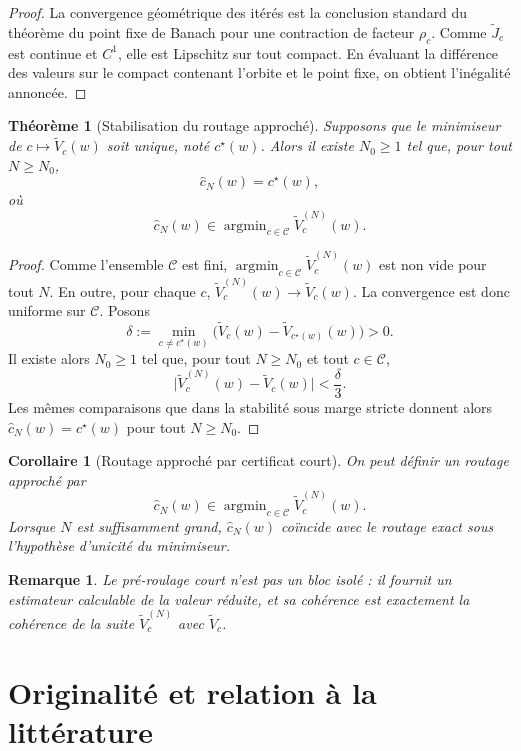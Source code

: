 \documentclass[11pt,a4paper]{article}
\newtheorem{theorem}{Théorème}[section]
\newtheorem{corollary}{Corollaire}[section]
\newtheorem{remark}{Remarque}[section]
\DeclareMathOperator{\argmin}{argmin}
\newcommand{\Ccal}{\mathcal C}
\begin{document}
\begin{proof}
La convergence géométrique des itérés est la conclusion standard du théorème du point fixe de Banach pour une contraction de facteur \(\rho_c\). Comme \(\widetilde J_c\) est continue et \(C^1\), elle est Lipschitz sur tout compact. En évaluant la différence des valeurs sur le compact contenant l'orbite et le point fixe, on obtient l'inégalité annoncée.
\end{proof}

\begin{theorem}[Stabilisation du routage approché]
Supposons que le minimiseur de \(c\mapsto \widetilde V_c(w)\) soit unique, noté \(c^\star(w)\). Alors il existe \(N_0\ge 1\) tel que, pour tout \(N\ge N_0\),
\[
\hat c_N(w)=c^\star(w),
\]
où
\[
\hat c_N(w)\in\argmin_{c\in\Ccal}\widetilde V_c^{(N)}(w).
\]
\end{theorem}

\begin{proof}
Comme l'ensemble \(\Ccal\) est fini, \(\argmin_{c\in\Ccal}\widetilde V_c^{(N)}(w)\) est non vide pour tout \(N\). En outre, pour chaque \(c\), \(\widetilde V_c^{(N)}(w)\to \widetilde V_c(w)\). La convergence est donc uniforme sur \(\Ccal\). Posons
\[
\delta:=\min_{c\neq c^\star(w)}\bigl(\widetilde V_c(w)-\widetilde V_{c^\star(w)}(w)\bigr)>0.
\]
Il existe alors \(N_0\ge 1\) tel que, pour tout \(N\ge N_0\) et tout \(c\in\Ccal\),
\[
\bigl|\widetilde V_c^{(N)}(w)-\widetilde V_c(w)\bigr|<\frac{\delta}{3}.
\]
Les mêmes comparaisons que dans la stabilité sous marge stricte donnent alors \(\hat c_N(w)=c^\star(w)\) pour tout \(N\ge N_0\).
\end{proof}

\begin{corollary}[Routage approché par certificat court]
On peut définir un routage approché par
\[
\hat c_N(w)\in\argmin_{c\in\Ccal}\widetilde V_c^{(N)}(w).
\]
Lorsque \(N\) est suffisamment grand, \(\hat c_N(w)\) coïncide avec le routage exact sous l'hypothèse d'unicité du minimiseur.
\end{corollary}

\begin{remark}
Le pré-roulage court n'est pas un bloc isolé : il fournit un estimateur calculable de la valeur réduite, et sa cohérence est exactement la cohérence de la suite \(\widetilde V_c^{(N)}\) avec \(\widetilde V_c\).
\end{remark}

\section{Originalité et relation à la littérature}
\end{document}
